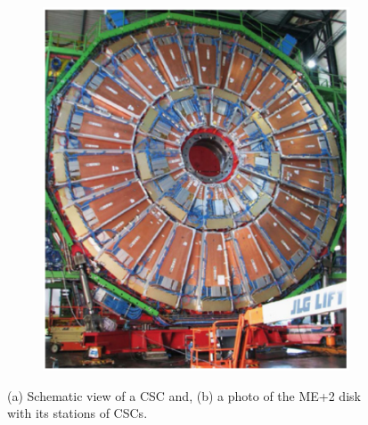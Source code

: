 \begin{figure}[ht]
\begin{subfigure}[b]{0.475\textwidth}
		\includegraphics[width=\textwidth]{MSc_Thesis/fig/csc2.png}
		\vspace{-0.75cm}
		\label{csc2}
	\end{subfigure}
	\caption[Schematic view of a CSC (a) and a photo of the ME+2 disk with its stations of CSCs.]
	{\small (a) Schematic view of a CSC and, (b) a photo of the ME+2 disk with its stations of CSCs\cite{Acosta2008}.}
	\label{csc}
\end{figure}

